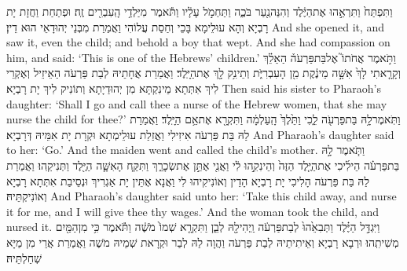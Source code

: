 {וַתִּפְתַּח֙ וַתִּרְאֵ֣הוּ אֶת\maqqaf הַיֶּ֔לֶד וְהִנֵּה\maqqaf נַ֖עַר בֹּכֶ֑ה וַתַּחְמֹ֣ל עָלָ֔יו וַתֹּ֕אמֶר מִיַּלְדֵ֥י הָֽעִבְרִ֖ים זֶֽה׃}
{וּפְתַחַת וַחֲזָת יָת רָבְיָא וְהָא עוּלֵימָא בָּכֵי וְחַסַת עֲלוֹהִי וַאֲמַרַת מִבְּנֵי יְהוּדָאֵי הוּא דֵין׃}
{And she opened it, and saw it, even the child; and behold a boy that wept. And she had compassion on him, and said: ‘This is one of the Hebrews’ children.’}{}
{וַתֹּ֣אמֶר אֲחֹתוֹ֮ אֶל\maqqaf בַּת\maqqaf פַּרְעֹה֒ הַאֵלֵ֗ךְ וְקָרָ֤אתִי לָךְ֙ אִשָּׁ֣ה מֵינֶ֔קֶת מִ֖ן הָעִבְרִיֹּ֑ת וְתֵינִ֥ק לָ֖ךְ אֶת\maqqaf הַיָּֽלֶד׃}
{וַאֲמַרַת אֲחָתֵיהּ לְבַת פַּרְעֹה הַאֵיזֵיל וְאֶקְרֵי לִיךְ אִתְּתָא מֵינִקְתָּא מִן יְהוּדַיָתָא וְתוֹנִיק לִיךְ יָת רָבְיָא׃}
{Then said his sister to Pharaoh’s daughter: ‘Shall I go and call thee a nurse of the Hebrew women, that she may nurse the child for thee?’}{}
{וַתֹּֽאמֶר\maqqaf לָ֥הּ בַּת\maqqaf פַּרְעֹ֖ה לֵ֑כִי וַתֵּ֙לֶךְ֙ הָֽעַלְמָ֔ה וַתִּקְרָ֖א אֶת\maqqaf אֵ֥ם הַיָּֽלֶד׃}
{וַאֲמַרַת לַהּ בַּת פַּרְעֹה אִיזִילִי וַאֲזַלַת עוּלֵימְתָא וּקְרָת יָת אִמֵּיהּ דְּרָבְיָא׃}
{And Pharaoh’s daughter said to her: ‘Go.’ And the maiden went and called the child’s mother.}{}
{וַתֹּ֧אמֶר לָ֣הּ בַּת\maqqaf פַּרְעֹ֗ה הֵילִ֜יכִי אֶת\maqqaf הַיֶּ֤לֶד הַזֶּה֙ וְהֵינִקִ֣הוּ לִ֔י וַאֲנִ֖י אֶתֵּ֣ן אֶת\maqqaf שְׂכָרֵ֑ךְ וַתִּקַּ֧ח הָאִשָּׁ֛ה הַיֶּ֖לֶד וַתְּנִיקֵֽהוּ׃}
{וַאֲמַרַת לַהּ בַּת פַּרְעֹה הָלִיכִי יָת רָבְיָא הָדֵין וְאוֹנִיקִיהוּ לִי וַאֲנָא אֶתֵּין יָת אַגְרִיךְ וּנְסֵיבַת אִתְּתָא רָבְיָא וְאוֹנִיקְתֵּיהּ׃}
{And Pharaoh’s daughter said unto her: ‘Take this child away, and nurse it for me, and I will give thee thy wages.’ And the woman took the child, and nursed it.}{}
{וַיִּגְדַּ֣ל הַיֶּ֗לֶד וַתְּבִאֵ֙הוּ֙ לְבַת\maqqaf פַּרְעֹ֔ה וַֽיְהִי\maqqaf לָ֖הּ לְבֵ֑ן וַתִּקְרָ֤א שְׁמוֹ֙ מֹשֶׁ֔ה וַתֹּ֕אמֶר כִּ֥י מִן\maqqaf הַמַּ֖יִם מְשִׁיתִֽהוּ׃}
{וּרְבָא רָבְיָא וְאֵיתִיתֵיהּ לְבַת פַּרְעֹה וַהֲוָה לַהּ לְבַר וּקְרָאת שְׁמֵיהּ מֹשֶׁה וַאֲמַרַת אֲרֵי מִן מַיָּא שְׁחַלְתֵּיהּ׃}
